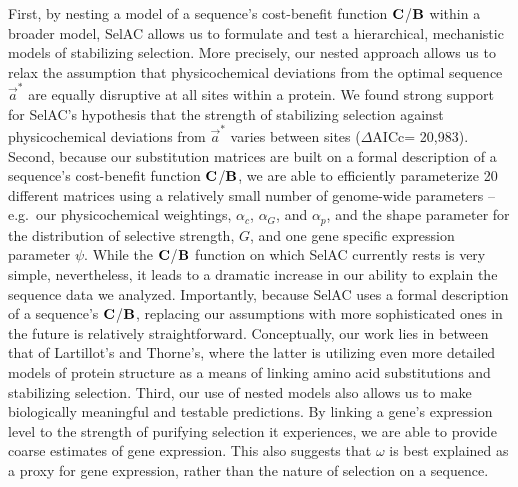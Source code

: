 \documentclass[12pt,letterpaper,fleqn]{article}
\newcommand{\PC}{physicochemical\xspace}
\newcommand{\Cost}{\ensuremath{\text{\textbf{C}}}\xspace}
\newcommand{\DeltaAICc}{\ensuremath{\Delta\text{AICc}}\xspace}
\newcommand{\Func}{\ensuremath{\text{\textbf{B}}}\xspace}
\newcommand{\selac}{SelAC\xspace}
\newcommand{\alphac}{\ensuremath{\alpha_c}\xspace}
\newcommand{\alphag}{\ensuremath{\alpha_G}\xspace}
\newcommand{\alphap}{\ensuremath{\alpha_p}\xspace}
\newcommand{\aoptvec}{\ensuremath{\Vec{a}^*}\xspace}
\begin{document}
First, by nesting a model of a sequence's cost-benefit function \Cost/\Func within a broader model, \selac allows us to formulate and test a hierarchical, mechanistic models of stabilizing selection.
More precisely, our nested approach allows us to relax the assumption that \PC deviations from the optimal sequence \aoptvec are equally disruptive at all sites within a protein.
We found strong support for \selac's hypothesis that the strength of stabilizing selection against \PC deviations from \aoptvec varies between sites (\DeltaAICc = 20,983).
Second, because our substitution matrices are built on a formal description of a sequence's cost-benefit function \Cost/\Func, we are able to efficiently parameterize 20 different matrices using a relatively small number of genome-wide parameters -- e.g.~our \PC weightings, \alphac, \alphag, and \alphap, and the shape parameter for the distribution of selective strength, $G$, and one gene specific expression parameter $\psi$.
While the \Cost/\Func function on which \selac currently rests is very simple, nevertheless, it leads to a dramatic increase in our ability to explain the sequence data we analyzed.
Importantly, because \selac uses a formal description of a sequence's \Cost/\Func,  replacing our assumptions with more sophisticated ones in the future is relatively straightforward.
Conceptually, our work lies in between that of Lartillot's and Thorne's, where the latter is utilizing even more detailed models of protein structure as a means of linking amino acid substitutions and stabilizing selection.
Third, our use of nested models also allows us to make biologically meaningful and testable predictions. By linking a gene's expression level to the strength of purifying selection it experiences, we are able to provide coarse estimates of gene expression. This also suggests that $\omega$ is best explained as a proxy for gene expression, rather than the nature of selection on a sequence.
\end{document}
